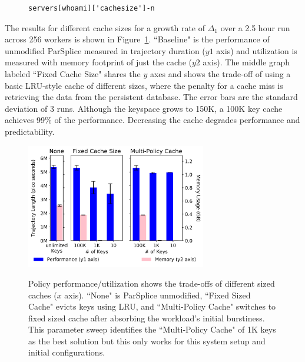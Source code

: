 \begin{figure}[h]
\footnotesize
\begin{verbatim}
servers[whoami]['cachesize']-n
\end{verbatim}
\end{figure}

The results for different cache sizes for a growth rate of \(\Delta_1\) over a
2.5 hour run across 256 workers is shown in
Figure~\ref{fig:methodology-tradeoff}.  ``Baseline" is the performance of
unmodified ParSplice  measured in trajectory duration (\(y1\) axis) and
utilization is measured with memory footprint of just the cache (\(y2\) axis).
The middle graph labeled ``Fixed Cache Size" shares the \(y\) axes and shows
the trade-off of using a basic LRU-style cache of different sizes, where the
penalty for a cache miss is retrieving the data from the persistent database.
The error bars are the standard deviation of 3 runs.  Although the keyspace
grows to 150K, a 100K key cache achieves 99\% of the performance. Decreasing
the cache degrades performance and predictability.




\begin{figure}[t]
\centering
\includegraphics[width=0.7\textwidth]{./chapters/controlplane/parsplice/figures/methodology-tradeoff.png}\\
\caption{Policy performance/utilization shows the trade-offs of different sized
caches (\(x\) axis).  ``None" is ParSplice unmodified, ``Fixed Sized Cache"
evicts keys using LRU, and ``Multi-Policy Cache" switches to fixed sized cache
after absorbing the workload's initial burstiness. This parameter sweep
identifies the ``Multi-Policy Cache" of 1K keys as the best solution but this
only works for this system setup and initial configurations.
 \label{fig:methodology-tradeoff}}
\end{figure}

